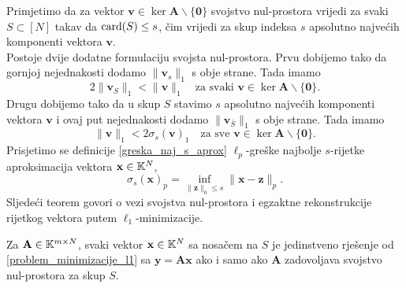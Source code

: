 \documentclass[a4paper,twoside,12pt]{memoir} %
\newcommand{\vect}[1]{\mathbf{#1}}
\renewcommand{\vec}{\vect}
\newcommand{\card}{\text{\normalfont{card}}}
\newcommand{\norm}[1]{\|{#1}\|}
\begin{document}
Primjetimo da za vektor $\vec v \in \ker \vec A \backslash \{ \vec 0\}$ svojstvo nul-prostora vrijedi za svaki $S \subset [N]$ takav da $\card(S) \leq s$, \v{c}im vrijedi za skup indeksa $s$ apsolutno najve\'cih komponenti vektora $\vec v$. \\
\indent Postoje dvije dodatne formulaciju svojsta nul-prostora. Prvu dobijemo tako da gornjoj nejednakosti dodamo $\norm{\vec v_s}_1$ s obje strane. Tada imamo
\begin{equation}\label{svojstvo_nul_prostora_form_1}
    2 \norm{\vec v_S}_1 < \norm{\vec v}_1 \quad \text{za svaki } \vec v \in \ker \vec A \backslash \{\vec 0\}.
\end{equation}
Drugu dobijemo tako da u skup $S$ stavimo $s$ apsolutno najve\'cih  komponenti vektora $\vec v$ i ovaj put nejednakosti dodamo $\norm{\vec v_{\bar S}}_1$ s obje strane. Tada imamo
\begin{equation}\label{svojstvo_nul_prostora_form_2}
    \norm{\vec v}_1 < 2 \sigma_s(\vec v)_1 \quad \text{za sve } \vec v \in \ker \vec A \backslash \{\vec 0\}.
\end{equation}
Prisjetimo se definicije \ref{greska_naj_s_aprox} $\ell_p$-gre\v{s}ke najbolje $s$-rijetke aproksimacija vektora $\vec x \in \K^N$,
\begin{equation*}
    \sigma_s(\vec x)_p = \inf_{\norm{\vec z}_0 \leq s} \norm{\vec x - \vec z}_p.
\end{equation*}
Sljede\'ci teorem govori o vezi svojstva nul-prostora i egzaktne rekonstrukcije rijetkog vektora putem $\ell_1$-minimizacije.
\begin{thm}\label{bp_tm1}
    Za $\vec A \in \K^{m \times N}$, svaki vektor $\vec x \in \K^N$ sa nosa\v{c}em na $S$ je jedinstveno rje\v{s}enje od \eqref{problem_minimizacije_l1} sa $\vec y = \vec {Ax}$ ako i samo ako $\vec A$ zadovoljava svojstvo nul-prostora za skup $S$.
\end{thm}
\end{document}

